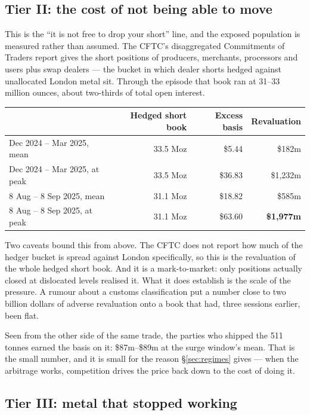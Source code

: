 \documentclass[11pt,a4paper]{article}
\begin{document}
\subsection{Tier II: the cost of not being able to move}

This is the ``it is not free to drop your short'' line, and the exposed population is measured
rather than assumed. The CFTC's disaggregated Commitments of Traders report gives the short
positions of producers, merchants, processors and users plus swap dealers --- the bucket in which
dealer shorts hedged against unallocated London metal sit. Through the episode that book ran at
31--33 million ounces, about two-thirds of total open interest.

\begin{center}
\small
\begin{tabular}{@{}lrrr@{}}
\toprule
& \textbf{Hedged short book} & \textbf{Excess basis} & \textbf{Revaluation} \\
\midrule
Dec 2024 -- Mar 2025, mean & 33.5 Moz & \$5.44 & \$182m \\
Dec 2024 -- Mar 2025, at peak & 33.5 Moz & \$36.83 & \$1,232m \\
8 Aug -- 8 Sep 2025, mean & 31.1 Moz & \$18.82 & \$585m \\
8 Aug -- 8 Sep 2025, at peak & 31.1 Moz & \$63.60 & \textbf{\$1,977m} \\
\bottomrule
\end{tabular}
\end{center}

Two caveats bound this from above. The CFTC does not report how much of the hedger bucket is
spread against London specifically, so this is the revaluation of the whole hedged short book.
And it is a mark-to-market: only positions actually closed at dislocated levels realised it. What
it does establish is the scale of the pressure. A rumour about a customs classification put a
number close to two billion dollars of adverse revaluation onto a book that had, three sessions
earlier, been flat.

Seen from the other side of the same trade, the parties who shipped the 511 tonnes earned the
basis on it: \$87m--\$89m at the surge window's mean. That is the small number, and it is small
for the reason \S\ref{sec:regimes} gives --- when the arbitrage works, competition drives the
price back down to the cost of doing it.

\subsection{Tier III: metal that stopped working}
\end{document}
